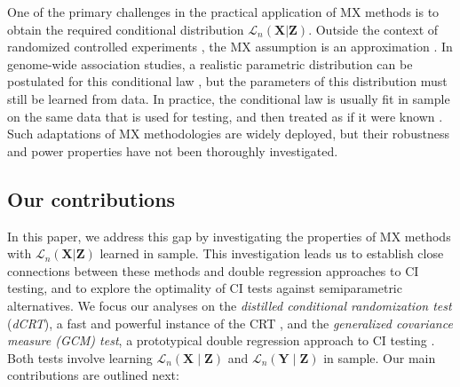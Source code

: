 \documentclass[aos]{imsart}
\theoremstyle{plain}
\theoremstyle{remark}
\newcommand{\prx}{\bm X}								%
\newcommand{\prz}{\bm Z}								%
\newcommand{\pry}{{\bm Y}}								%
\newcommand{\law}{\mathcal L}							%
\begin{document}
One of the primary challenges in the practical application of MX methods is to obtain the required conditional distribution $\law_n(\prx|\prz)$. Outside the context of randomized controlled experiments \citep{Aufiero2022, Ham2022}, the MX assumption is an approximation \citep{Barber2018, Huang2019, Li2022}. In genome-wide association studies, a realistic parametric distribution can be postulated for this conditional law \citep{SetC17}, but the parameters of this distribution must still be learned from data. In practice, the conditional law is usually fit in sample on the same data that is used for testing, and then treated as if it were known \citep{CetL16, SetC17, SetS19, Bates2020, Liu2022a, Li2021b, Sesia2021, Katsevich2020c}. Such adaptations of MX methodologies are widely deployed, but their robustness and power properties have not been thoroughly investigated. 

\subsection{Our contributions} 

In this paper, we address this gap by investigating the properties of MX methods with $\law_n(\prx|\prz)$ learned in sample. This investigation leads us to establish close connections between these methods and double regression approaches to CI testing, and to explore the optimality of CI tests against semiparametric alternatives. We focus our analyses on the \textit{distilled conditional randomization test} (\textit{dCRT}), a fast and powerful instance of the CRT \citep{Liu2022a}, and the \textit{generalized covariance measure (GCM) test}, a prototypical double regression approach to CI testing \citep{Shah2018}. Both tests involve learning $\law_n(\prx \mid \prz)$ and $\law_n(\pry \mid \prz)$ in sample. Our main contributions are outlined next:
\end{document}
